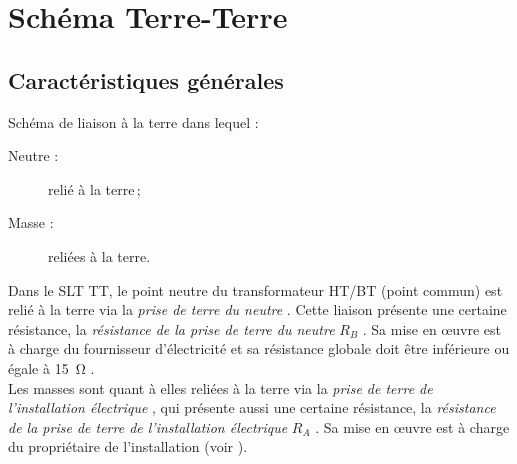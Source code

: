 

\begin{comment}

\documentclass[a4paper, 11pt, twoside, fleqn]{memoir}

\usepackage{AOCDTF}

\marqueurchapitre


	\openleft %

\end{comment}

\chapter{Schéma Terre-Terre}
\ChapFrame

\section{Caractéristiques générales}

\begin{definition}[Schéma TT]
Schéma de liaison à la terre dans lequel :
\begin{description}
\item[Neutre :] relié à la terre\,;
\item[Masse :] reliées à la terre.
\end{description}
\end{definition}

Dans le SLT TT, le point neutre du transformateur HT/BT (point commun) est relié à la terre via la \emph{prise de terre du neutre} . Cette liaison présente une certaine résistance, la \emph{résistance de la prise de terre du neutre} $R_B$ . Sa mise en \oe{}uvre est à charge du fournisseur d'électricité et sa résistance globale doit être inférieure ou égale à \SI{15}{\ohm} \supercite{NF:C13-100-2015}.\\
Les masses sont quant à elles reliées à la terre via la \emph{prise de terre de l'installation électrique} , qui présente aussi une certaine résistance, la \emph{résistance de la prise de terre de l'installation électrique} $R_A$ . Sa mise en \oe{}uvre est à charge du propriétaire de l'installation (voir ).\\ 

